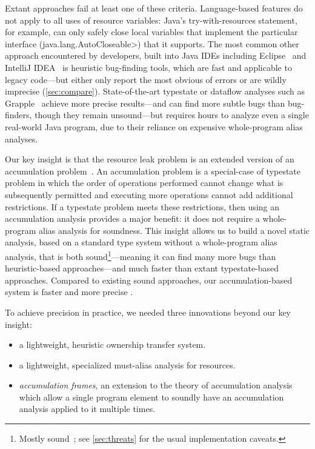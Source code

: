 Extant approaches fail at least one of these criteria.
Language-based features do not apply to all uses of resource variables:
Java's try-with-resources statement, for example, can
only safely close local variables that implement the particular
interface (\<java.lang.AutoCloseable>) that it supports.
The most common other
approach encountered by developers, built into Java IDEs including
Eclipse~\cite{ecj-resource-leak} and IntelliJ
IDEA~\cite{idea-resource-leak} is heuristic bug-finding tools, which
are fast and applicable to legacy code---but either only report the most obvious of
errors or are wildly imprecise (\cref{sec:compare}).
State-of-the-art typestate or dataflow analyses such as
Grapple~\cite{zuo2019grapple} achieve more precise results---and
can find more subtle bugs than bug-finders, though they remain unsound---but
requires hours to analyze even a single real-world Java program, due
to their reliance on expensive whole-program alias analyses.

Our key insight is that the resource leak problem is an extended
version of an accumulation problem~\cite{KelloggRSSE2020}. An
accumulation problem is a special-case of typestate problem in which
the order of operations performed cannot change what is subsequently
permitted and executing more operations cannot add additional
restrictions.  If a typestate problem meets these restrictions, then
using an accumulation analysis provides a major benefit: it does not
require a whole-program alias analysis for soundness.  This insight allows
us to build a novel static analysis, based on a standard type system
without a whole-program alias analysis, that is both sound\footnote{Mostly
  sound~\cite{livshits2015defense}; see
\cref{sec:threats} for the usual implementation caveats.}---meaning it
can find many more bugs than heuristic-based approaches---and much
faster than extant typestate-based approaches.  Compared to existing
sound approaches, our accumulation-based system is faster and more
precise .

To achieve precision in practice, we needed three
innovations beyond our key insight:
\begin{itemize}
\item a lightweight, heuristic ownership transfer system.
\item a lightweight, specialized must-alias analysis for resources.
\item \emph{accumulation frames}, an extension to the theory of
  accumulation analysis which allow a single program element to
  soundly have an accumulation analysis applied to it multiple times.
\end{itemize}

